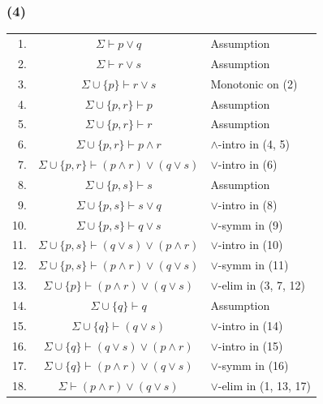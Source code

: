 \documentclass{article}
\begin{document}
\subsubsection*{(4)}
\begin{tabular}{r c l}
    1. & $\Sigma\vdash p\lor q$ & Assumption\\
    2. & $\Sigma\vdash r\lor s$ & Assumption\\
    3. & $\Sigma\cup\{p\}\vdash r\lor s$ & Monotonic on (2)\\
    4. & $\Sigma\cup\{p, r\}\vdash p$ & Assumption\\
    5. & $\Sigma\cup\{p, r\}\vdash r$ & Assumption\\
    6. & $\Sigma\cup\{p, r\}\vdash p\wedge r$ & $\wedge$-intro in (4, 5)\\
    7. & $\Sigma\cup\{p, r\}\vdash (p\wedge r)\lor (q\lor s)$ & $\lor$-intro in (6)\\
    8. & $\Sigma\cup\{p, s\}\vdash s$ & Assumption\\
    9. & $\Sigma\cup\{p, s\}\vdash s\lor q$ & $\lor$-intro in (8)\\
    10. & $\Sigma\cup\{p, s\}\vdash q\lor s$ & $\lor$-symm in (9)\\
    11. & $\Sigma\cup\{p, s\}\vdash (q\lor s)\lor (p\wedge r)$ & $\lor$-intro in (10)\\
    12. & $\Sigma\cup\{p, s\}\vdash (p\wedge r)\lor (q\lor s)$ & $\lor$-symm in (11)\\
    13. & $\Sigma\cup\{p\}\vdash (p\wedge r)\lor (q\lor s)$ & $\lor$-elim in (3, 7, 12)\\
    14. & $\Sigma\cup\{q\}\vdash q$ & Assumption\\
    15. & $\Sigma\cup\{q\}\vdash (q\lor s)$ & $\lor$-intro in (14)\\
    16. & $\Sigma\cup\{q\}\vdash (q\lor s)\lor (p\wedge r)$ & $\lor$-intro in (15)\\
    17. & $\Sigma\cup\{q\}\vdash (p\wedge r)\lor (q\lor s)$ & $\lor$-symm in (16)\\
    18. & $\Sigma\vdash (p\wedge r)\lor (q\lor s)$ & $\lor$-elim in (1, 13, 17)\\
\end{tabular}
\end{document}

